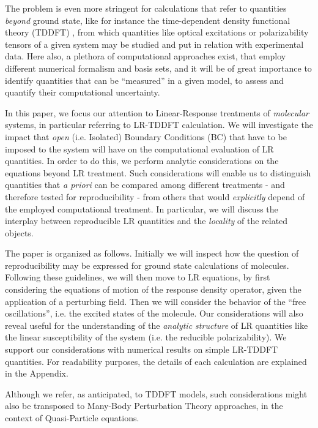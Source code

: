 \documentclass[reprint,aps,prb]{revtex4-1}
\begin{document}
The problem is even more stringent for calculations that refer to quantities \emph{beyond} ground state, like
for instance the time-dependent density functional theory (TDDFT) \cite{casida1995,runge1984,onida2002},
from which quantities like optical excitations or polarizability tensors
of a given system may be studied and put in relation with experimental data.
Here also, a plethora of computational approaches exist, that employ different numerical formalism and
basis sets, and it will be of great importance to identify quantities that can be ``measured'' in a given model, to assess
and quantify their computational uncertainty.

In this paper, we focus our attention to Linear-Response treatments of \emph{molecular} systems, 
in particular referring to LR-TDDFT calculation. We will investigate the impact that 
\emph{open} (i.e. Isolated) Boundary Conditions (BC) that have to be imposed to the system will have on the computational evaluation of LR quantities.
In order to do this, we perform analytic considerations on the equations beyond LR treatment.
Such considerations will enable us to distinguish quantities that \textit{a priori} can be compared among different treatments - and therefore tested for reproducibility - 
from others that would \emph{explicitly} depend of the employed computational treatment. 
In particular, we will discuss the interplay between reproducible LR quantities and the \emph{locality} of the related objects.

The paper is organized as follows.
Initially we will inspect how the question of reproducibility may be expressed 
for ground state calculations of molecules. 
Following these guidelines, we will then move to LR equations,
by first considering the equations of motion of the response density operator, given
the application of a perturbing field.
Then we will consider the behavior of the ``free oscillations'', i.e. the excited states
of the molecule.
Our considerations will also reveal useful for the understanding of the \emph{analytic structure} of LR quantities like
the linear susceptibility of the system (i.e. the reducible polarizability).
We support our considerations with numerical results on simple LR-TDDFT quantities.
For readability purposes, the details of each calculation are explained in the Appendix.

Although we refer, as anticipated, to TDDFT models, such considerations might also be transposed to Many-Body Perturbation Theory
approaches, in the context of Quasi-Particle equations.
\end{document}
